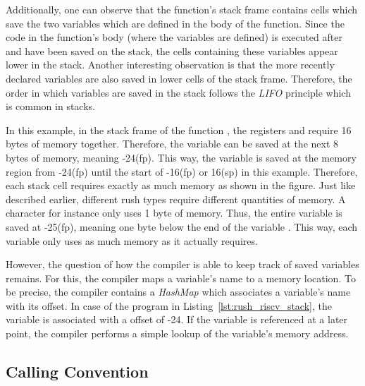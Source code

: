 Additionally, one can observe that the  function's
stack frame contains cells which save the two variables which are defined in the body of the function.
Since the code in the function's body (where the variables are defined) is executed after  and  have been saved on the stack,
the cells containing these variables appear lower in the stack.
Another interesting observation is that the more recently declared variables are also saved in lower cells of the stack frame.
Therefore, the order in which variables are saved in the stack follows the \emph{LIFO} principle which is common in stacks.

In this example, in the stack frame of the function , the registers  and  require 16 bytes of memory together.
Therefore, the variable  can be saved at the next 8 bytes of memory, meaning -24(fp).
This way, the variable is saved at the memory region from -24(fp) until the start of -16(fp) or 16(sp) in this example.
Therefore, each stack cell requires exactly as much memory as shown in the figure.
Just like described earlier, different rush types require different quantities of memory.
A character for instance only uses 1 byte of memory.
Thus, the entire variable  is saved at -25(fp), meaning one byte below the end of the variable .
This way, each variable only uses as much memory as it actually requires.

However, the question of how the compiler is able to keep track of saved variables remains.
For this, the compiler maps a variable's name to a memory location.
To be precise, the compiler contains a \emph{HashMap} which associates a variable's name with its  offset.
In case of the program in Listing~\ref{lst:rush_riscv_stack}, the variable  is associated with a  offset of -24.
If the variable is referenced at a later point, the compiler performs a simple lookup of the variable's memory address.

\subsection{Calling Convention}\label{sec:riscv_calling_conv}

